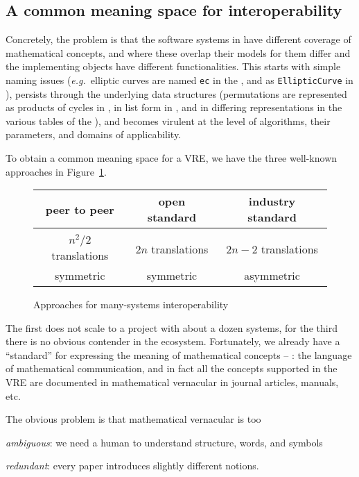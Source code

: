 \subsection{A common meaning space for interoperability}

Concretely, the problem is that the software systems in \ODK have different coverage of mathematical concepts, and
where these overlap their models for them differ and the implementing objects have different functionalities.
This starts with simple naming issues (\emph{e.g.}\ elliptic curves are named
\lstinline|ec| in the \LMFDB, and as \lstinline|EllipticCurve| in \Sage), persists through
the underlying data structures (permutations are represented as products of cycles in
\GAP, in list form in \Sage, and in differing representations in the various tables of the
\LMFDB), and becomes virulent at the level of algorithms, their parameters, and domains of
applicability.

To obtain a common meaning space for a VRE, we have the three well-known approaches in
Figure~\ref{fig:interop}.
\begin{figure}[ht]\centering
  \begin{tabular}{|c|c|c|}\hline
    peer to peer & open standard & industry standard\\\hline
     &  & \\\hline
    $n^2/2$  translations & $2n$ translations & $2n-2$ translations \\
    symmetric & symmetric & asymmetric\\\hline
  \end{tabular}
  \caption{Approaches for many-systems interoperability}\label{fig:interop}
\end{figure}

The first does not scale to a project with about a dozen systems, for the third there is
no obvious contender in the \ODK ecosystem. Fortunately, we already have a ``standard'' for
expressing the meaning of mathematical concepts -- : the language of
mathematical communication, and in fact all the concepts supported in the \ODK VRE are documented
in mathematical vernacular in journal articles, manuals, etc.

The obvious problem is that mathematical vernacular is too 
\begin{inparaenum}[\em i\rm)]
\item \emph{ambiguous}: we need a human to understand structure, words, and symbols
\item \emph{redundant}: every paper introduces slightly different notions. 
\end{inparaenum}

